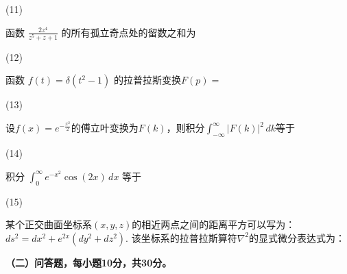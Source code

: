 \documentclass[CJK]{article}
\begin{document}
\item[(11)]{函数 $\frac{2z^4}{z^{5}+z+1}$ 的所有孤立奇点处的留数之和为 

    }  
\item[(12)]{函数 $f(t) = \delta(t^2-1)$ 的拉普拉斯变换$F(p)=$ 

}
\item[(13)]{设$f(x) = e^{-\frac{x^2}{2}}$的傅立叶变换为$F(k)$，则积分$\int_{-\infty}^\infty \left\vert F(k)\right\vert^2\,dk$等于

}
\item[(14)]{积分 $\int_0^\infty e^{-x^2}\cos{(2x)}\,dx$ 等于

}
\item[(15)]{某个正交曲面坐标系$(x,y,z)$的相近两点之间的距离平方可以写为：$ ds^2 = dx^2 + e^{2x}\left(dy^2 + dz^2\right).$
  该坐标系的拉普拉斯算符$\nabla^2$的显式微分表达式为：

}
  
  
\eitem

\newpage
{\bf \noindent （二）问答题，每小题10分，共30分。}
\end{document}
